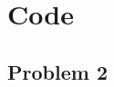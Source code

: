 \documentclass[12pt]{article}
\newcommand{\1}{{\bf 1}} %
\begin{document}
\section*{Code}
\subsection*{Problem 2}
%
%
%
%
%
%
%
%
%
%
\end{document}
